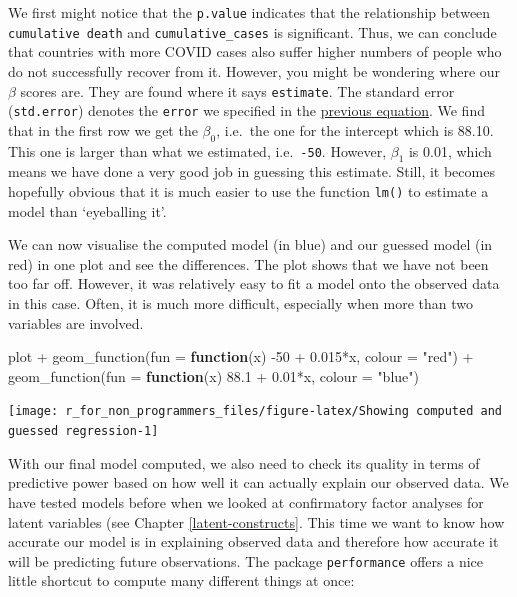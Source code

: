 \documentclass[
]{book}
\newenvironment{Shaded}{\begin{snugshade}}{\end{snugshade}}
\newcommand{\AttributeTok}[1]{\textcolor[rgb]{0.77,0.63,0.00}{#1}}
\newcommand{\ControlFlowTok}[1]{\textcolor[rgb]{0.13,0.29,0.53}{\textbf{#1}}}
\newcommand{\DecValTok}[1]{\textcolor[rgb]{0.00,0.00,0.81}{#1}}
\newcommand{\FloatTok}[1]{\textcolor[rgb]{0.00,0.00,0.81}{#1}}
\newcommand{\FunctionTok}[1]{\textcolor[rgb]{0.00,0.00,0.00}{#1}}
\newcommand{\NormalTok}[1]{#1}
\newcommand{\SpecialCharTok}[1]{\textcolor[rgb]{0.00,0.00,0.00}{#1}}
\newcommand{\StringTok}[1]{\textcolor[rgb]{0.31,0.60,0.02}{#1}}
\begin{document}
We first might notice that the \texttt{p.value} indicates that the relationship between \texttt{cumulative\ death} and \texttt{cumulative\_cases} is significant. Thus, we can conclude that countries with more COVID cases also suffer higher numbers of people who do not successfully recover from it. However, you might be wondering where our \(\beta\) scores are. They are found where it says \texttt{estimate}. The standard error (\texttt{std.error}) denotes the \texttt{error} we specified in the \protect\hyperlink{single-linear-regression}{previous equation}. We find that in the first row we get the \(\beta_0\), i.e.~the one for the intercept which is 88.10. This one is larger than what we estimated, i.e.~\texttt{-50}. However, \(\beta_1\) is 0.01, which means we have done a very good job in guessing this estimate. Still, it becomes hopefully obvious that it is much easier to use the function \texttt{lm()} to estimate a model than `eyeballing it'.

We can now visualise the computed model (in blue) and our guessed model (in red) in one plot and see the differences. The plot shows that we have not been too far off. However, it was relatively easy to fit a model onto the observed data in this case. Often, it is much more difficult, especially when more than two variables are involved.

\begin{Shaded}
\begin{Highlighting}[]
\NormalTok{plot }\SpecialCharTok{+}
  \FunctionTok{geom\_function}\NormalTok{(}\AttributeTok{fun =} \ControlFlowTok{function}\NormalTok{(x) }\SpecialCharTok{{-}}\DecValTok{50} \SpecialCharTok{+} \FloatTok{0.015}\SpecialCharTok{*}\NormalTok{x, }\AttributeTok{colour =} \StringTok{"red"}\NormalTok{) }\SpecialCharTok{+}
    \FunctionTok{geom\_function}\NormalTok{(}\AttributeTok{fun =} \ControlFlowTok{function}\NormalTok{(x) }\FloatTok{88.1} \SpecialCharTok{+} \FloatTok{0.01}\SpecialCharTok{*}\NormalTok{x, }\AttributeTok{colour =} \StringTok{"blue"}\NormalTok{)}
\end{Highlighting}
\end{Shaded}

\begin{center}\texttt{[image: r\_for\_non\_programmers\_files/figure-latex/Showing computed and guessed regression-1]} \end{center}

With our final model computed, we also need to check its quality in terms of predictive power based on how well it can actually explain our observed data. We have tested models before when we looked at confirmatory factor analyses for latent variables (see Chapter \ref{latent-constructs}. This time we want to know how accurate our model is in explaining observed data and therefore how accurate it will be predicting future observations. The package \texttt{performance} offers a nice little shortcut to compute many different things at once:
\end{document}
